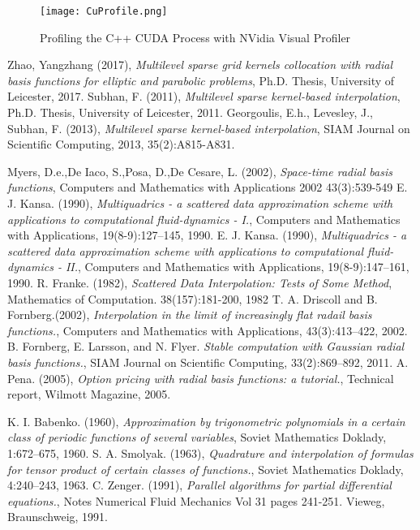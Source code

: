 \documentclass[a4paper]{amsart}
\begin{document}
\begin{landscape}
\begin{figure}[h]
\centering
\texttt{[image: CuProfile.png]}
\caption {Profiling the C++ CUDA Process with NVidia Visual Profiler}
\label {fig:prof2}
\end{figure}
\end{landscape}
\newpage
\begin{thebibliography}{99}
 Zhao, Yangzhang (2017), {\em Multilevel sparse grid kernels collocation with radial basis functions for elliptic and parabolic problems}, Ph.D. Thesis, University of Leicester, 2017.
 Subhan, F. (2011), {\em Multilevel sparse kernel-based interpolation}, Ph.D. Thesis, University of Leicester, 2011.
 Georgoulis, E.h., Levesley, J., Subhan, F. (2013), {\em Multilevel sparse kernel-based interpolation}, SIAM Journal on Scientific Computing, 2013, 35(2):A815-A831.


 Myers, D.e.,De Iaco, S.,Posa, D.,De Cesare, L. (2002), {\em Space-time radial basis functions}, Computers and Mathematics with Applications 2002 43(3):539-549
 E. J. Kansa. (1990), {\em Multiquadrics - a scattered data approximation scheme
with applications to computational fluid-dynamics - I.}, Computers and Mathematics with Applications, 19(8-9):127–145, 1990.
 E. J. Kansa. (1990), {\em Multiquadrics - a scattered data approximation scheme
with applications to computational fluid-dynamics - II.}, Computers and Mathematics with Applications, 19(8-9):147–161, 1990.
 R. Franke. (1982), {\em Scattered Data Interpolation: Tests of Some Method}, Mathematics of Computation. 38(157):181-200, 1982
 T. A. Driscoll and B. Fornberg.(2002), {\em Interpolation in the limit of increasingly flat radail basis functions.}, Computers and Mathematics with Applications, 43(3):413–422, 2002.
 B. Fornberg, E. Larsson, and N. Flyer. {\em Stable computation with Gaussian radial basis functions.}, SIAM Journal on Scientific Computing,
33(2):869–892, 2011.
 A. Pena. (2005), {\em Option pricing with radial basis functions: a tutorial.}, Technical
report, Wilmott Magazine, 2005.

 K. I. Babenko. (1960), {\em Approximation by trigonometric polynomials in a certain class of periodic functions of several variables}, Soviet Mathematics Doklady, 1:672–675, 1960.
 S. A. Smolyak. (1963), {\em Quadrature and interpolation of formulas for tensor product of certain classes of functions.}, Soviet Mathematics Doklady, 4:240–243, 1963.
 C. Zenger. (1991), {\em Parallel algorithms for partial differential equations.}, Notes Numerical Fluid Mechanics Vol 31 pages 241-251. Vieweg, Braunschweig, 1991.


\end{thebibliography}
\end{document}
